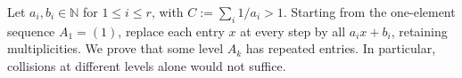 Let $a_i,b_i\in\mathbb N$ for $1\le i\le r$, with $C:=\sum_i1/a_i>1$. Starting from the one-element sequence $A_1=(1)$, replace each entry $x$ at every step by all $a_ix+b_i$, retaining multiplicities. We prove that some level $A_k$ has repeated entries. In particular, collisions at different levels alone would not suffice.
